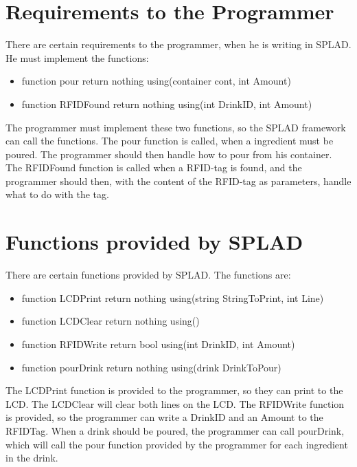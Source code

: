 \section{Requirements to the Programmer}
There are certain requirements to the programmer, when he is writing in SPLAD. He must implement the functions:
\begin{itemize}
	\item {\color[rgb]{0,0,1}function} pour {\color[rgb]{0,0,1}return} {\color[rgb]{0.545,0.133,0.133}nothing} {\color[rgb]{0,0,1}using}({\color[rgb]{0.545,0.133,0.133}container} cont, {\color[rgb]{0.545,0.133,0.133}int} Amount)
	\item {\color[rgb]{0,0,1}function} RFIDFound {\color[rgb]{0,0,1}return} {\color[rgb]{0.545,0.133,0.133}nothing} {\color[rgb]{0,0,1}using}({\color[rgb]{0.545,0.133,0.133}int} DrinkID, {\color[rgb]{0.545,0.133,0.133}int} Amount)
\end{itemize}
The programmer must implement these two functions, so the SPLAD framework can call the functions. The pour function is called, when a ingredient must be poured. The programmer should then handle how to pour from his container.
The RFIDFound function is called when a RFID-tag is found, and the programmer should then, with the content of the RFID-tag as parameters, handle what to do with the tag.

\section{Functions provided by SPLAD}
There are certain functions provided by SPLAD. The functions are:
\begin{itemize}
	\item {\color[rgb]{0,0,1}function} LCDPrint {\color[rgb]{0,0,1}return} {\color[rgb]{0.545,0.133,0.133}nothing} {\color[rgb]{0,0,1}using}({\color[rgb]{0.545,0.133,0.133}string} StringToPrint, {\color[rgb]{0.545,0.133,0.133}int} Line)
	\item {\color[rgb]{0,0,1}function} LCDClear {\color[rgb]{0,0,1}return} {\color[rgb]{0.545,0.133,0.133}nothing} {\color[rgb]{0,0,1}using}()
	\item {\color[rgb]{0,0,1}function} RFIDWrite {\color[rgb]{0,0,1}return} {\color[rgb]{0.545,0.133,0.133}bool} {\color[rgb]{0,0,1}using}({\color[rgb]{0.545,0.133,0.133}int} DrinkID, {\color[rgb]{0.545,0.133,0.133}int} Amount)
	\item {\color[rgb]{0,0,1}function} pourDrink {\color[rgb]{0,0,1}return} {\color[rgb]{0.545,0.133,0.133}nothing} {\color[rgb]{0,0,1}using}({\color[rgb]{0.545,0.133,0.133}drink} DrinkToPour)
\end{itemize}
The LCDPrint function is provided to the programmer, so they can print to the LCD. The LCDClear will clear both lines on the LCD. The RFIDWrite function is provided, so the programmer can write a DrinkID and an Amount to the RFIDTag. When a drink should be poured, the programmer can call pourDrink, which will call the pour function provided by the programmer for each ingredient in the drink.